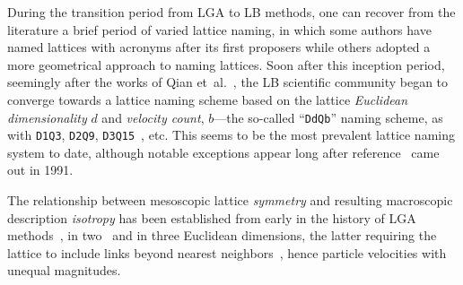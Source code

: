     During the transition period from LGA to LB methods, one can recover from the literature a brief period  of  varied  lattice
    naming, in which some authors have named lattices with acronyms after its  first  proposers  while  others  adopted  a  more
    geometrical  approach  to  naming  lattices.  Soon  after  this  inception  period,  seemingly  after  the  works  of   Qian
    et~al.~\cite{1991-QianYH+LallemandP-AdvKinTheoContMech, 1992-QianYH+LallemandP-EurophysLett}, the  LB  scientific  community
    began to  converge  towards  a  lattice  naming  scheme  based  on  the  lattice  \emph{Euclidean  dimensionality}  $d$  and
    \emph{velocity  count},  $b$---the  so-called  ``\texttt{DdQb}''  naming  scheme,  as  with  \texttt{D1Q3},   \texttt{D2Q9},
    \texttt{D3Q15}~\cite{1992-QianYH+LallemandP-EurophysLett}, etc. This seems to be the most prevalent lattice naming system to
    date, although notable exceptions appear long after reference~\cite{1991-QianYH+LallemandP-AdvKinTheoContMech} came  out  in
    1991.

    The relationship between mesoscopic lattice \emph{symmetry} and resulting macroscopic description \emph{isotropy}  has  been
    established from early in the history of LGA methods~\cite{1973-HardyJ+PazzisO-JMathPhys, 1976-HardyJ+PomeauY-PhysRevA},  in
    two~\cite{1986-FrischU+PomeauY-PhysRevLett} and in three Euclidean dimensions, the latter requiring the lattice  to  include
    links  beyond  nearest  neighbors~\cite[pp.~473,490]{1986-WolframS-JStatPhys},  hence  particle  velocities   with   unequal
    magnitudes.





